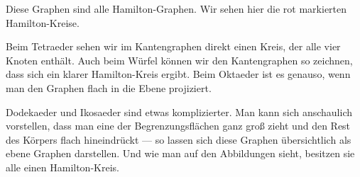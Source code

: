 \begin{spoken-clean}[00:36:46 - 00:38:07]
Diese Graphen sind alle Hamilton-Graphen. Wir sehen hier die rot markierten Hamilton-Kreise.

Beim Tetraeder sehen wir im Kantengraphen direkt einen Kreis, der alle vier Knoten enthält. Auch beim Würfel können wir den Kantengraphen so zeichnen, dass sich ein klarer Hamilton-Kreis ergibt. Beim Oktaeder ist es genauso, wenn man den Graphen flach in die Ebene projiziert.

Dodekaeder und Ikosaeder sind etwas komplizierter. Man kann sich anschaulich vorstellen, dass man eine der Begrenzungsflächen ganz groß zieht und den Rest des Körpers flach hineindrückt --- so lassen sich diese Graphen übersichtlich als ebene Graphen darstellen. Und wie man auf den Abbildungen sieht, besitzen sie alle einen Hamilton-Kreis.
\end{spoken-clean}

